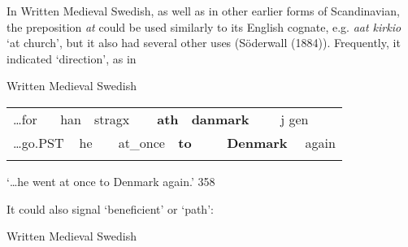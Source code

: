 \begin{styleBodytextC}
In Written Medieval Swedish, as well as in other earlier forms of Scandinavian, the preposition \textit{at} could be used similarly to its English cognate, e.g. \textit{aat kirkio} ‘at church’, but it also had several other uses (Söderwall (1884)). Frequently, it indicated ‘direction’, as in

\end{styleBodytextC}

\begin{listWWNumileveli}
\item 

\begin{styleExample}
Written Medieval Swedish

\end{styleExample}

\end{listWWNumileveli}

\begin{tabular}{llllllllllll}
\lsptoprule
…for & \multicolumn{2}{l}{han

} & \multicolumn{2}{l}{stragx

} & \multicolumn{2}{l}{{\bfseries ath}

} & \multicolumn{2}{l}{{\bfseries danmark}

} & \multicolumn{2}{l}{j gen

} & \\
\multicolumn{2}{l}{…go.PST

} & \multicolumn{2}{l}{he

} & \multicolumn{2}{l}{at\_once

} & \multicolumn{2}{l}{{\bfseries to}

} & \multicolumn{2}{l}{{\bfseries Denmark}

} & \multicolumn{2}{l}{again

}\\
\lspbottomrule
\end{tabular}

\begin{styleTranslation}
‘…he went at once to Denmark again.’ 358

\end{styleTranslation}

It could also signal ‘beneficient’ or ‘path’:

\begin{listWWNumileveli}
\item 

\begin{styleExample}
Written Medieval Swedish

\end{styleExample}

\end{listWWNumileveli}


